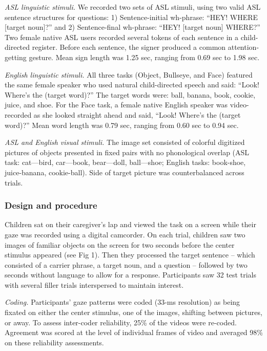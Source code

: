 \documentclass[english,man]{apa6}
\theoremstyle{definition}
\theoremstyle{definition}
\theoremstyle{definition}
\theoremstyle{remark}
\begin{document}
\emph{ASL linguistic stimuli.} We recorded two sets of ASL stimuli,
using two valid ASL sentence structures for questions: 1)
Sentence-initial wh-phrase: \enquote{HEY! WHERE {[}target noun{]}?} and
2) Sentence-final wh-phrase: \enquote{HEY! {[}target noun{]} WHERE?} Two
female native ASL users recorded several tokens of each sentence in a
child-directed register. Before each sentence, the signer produced a
common attention-getting gesture. Mean sign length was 1.25 sec, ranging
from 0.69 sec to 1.98 sec.

\emph{English linguistic stimuli.} All three tasks (Object, Bullseye,
and Face) featured the same female speaker who used natural
child-directed speech and said: \enquote{Look! Where's the (target
word)?} The target words were: ball, banana, book, cookie, juice, and
shoe. For the Face task, a female native English speaker was
video-recorded as she looked straight ahead and said, \enquote{Look!
Where's the (target word)?} Mean word length was 0.79 sec, ranging from
0.60 sec to 0.94 sec.

\emph{ASL and English visual stimuli.} The image set consisted of
colorful digitized pictures of objects presented in fixed pairs with no
phonological overlap (ASL task: cat---bird, car---book, bear---doll,
ball---shoe; English tasks: book-shoe, juice-banana, cookie-ball). Side
of target picture was counterbalanced across trials.

\hypertarget{design-and-procedure}{%
\subsubsection{Design and procedure}\label{design-and-procedure}}

Children sat on their caregiver's lap and viewed the task on a screen
while their gaze was recorded using a digital camcorder. On each trial,
children saw two images of familiar objects on the screen for two
seconds before the center stimulus appeared (see Fig 1). Then they
processed the target sentence -- which consisted of a carrier phrase, a
target noun, and a question -- followed by two seconds without language
to allow for a response. Participants saw 32 test trials with several
filler trials interspersed to maintain interest.

\emph{Coding.} Participants' gaze patterns were coded (33-ms resolution)
as being fixated on either the center stimulus, one of the images,
shifting between pictures, or away. To assess inter-coder reliability,
25\% of the videos were re-coded. Agreement was scored at the level of
individual frames of video and averaged 98\% on these reliability
assessments.
\end{document}
